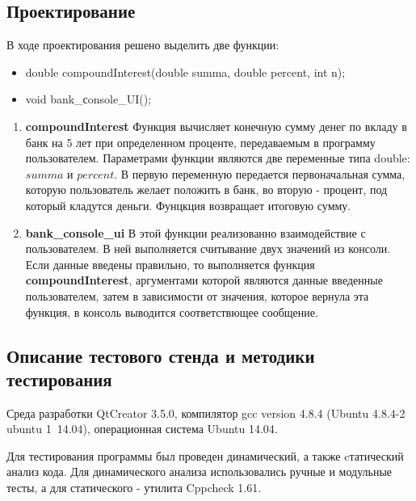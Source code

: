\documentclass[12pt,a4paper]{report}
\begin{document}
\subsection{Проектирование}
\hspace{\parindent}
В ходе проектирования решено выделить две функции:
\begin{itemize}
\item double compoundInterest(double summa, double percent, int n);
\item void bank\_сonsole\_UI();
\end{itemize}
	\begin{enumerate}
	
		\item \textbf{compoundInterest}
		Функция вычисляет конечную сумму денег по вкладу в банк на 5 лет при определенном проценте, передаваемым в программу пользователем.
		 Параметрами функции являются две переменные типа double: $summa$ и $percent$. В первую переменную передается первоначальная сумма, которую пользователь желает положить в банк, во вторую - процент, под который кладутся деньги. Фунцкция возвращает итоговую сумму.
		 
		\item \textbf{bank\_console\_ui}
		 В этой функции реализованно взаимодействие с пользователем. В ней выполняется считывание двух значений из консоли. Если данные введены правильно, то выполняется функция \textbf{compoundInterest}, аргументами которой являются данные введенные пользователем, затем в зависимости от значения, которое вернула эта функция, в  консоль выводится соответствющее сообщение. 		
	\end{enumerate}
	
\subsection{Описание тестового стенда и методики тестирования}
\hspace{\parindent}
Среда разработки QtCreator 3.5.0, компилятор gcc version 4.8.4 (Ubuntu 4.8.4-2 ubuntu 1~14.04), операционная система Ubuntu 14.04. 

Для тестирования программы был проведен динамический, а также cтатический анализ кода. Для динамического анализа использовались ручные и модульные тесты, а для статического - утилита Cppcheck 1.61.
\end{document}
